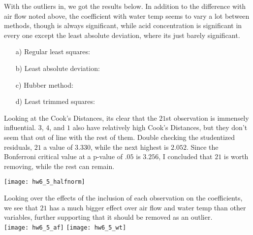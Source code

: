 \documentclass[11pt]{article}
\theoremstyle{definition}
\begin{document}
\begin{itemize}
        \smallskip
        With the outliers in, we got the results below. In addition to the difference with air flow noted above, the coefficient with water temp seems to vary a lot between methods, though is always significant, while  acid concentration is significant in every one except the least absolute deviation, where its just barely significant.
        \begin{itemize}
            \item[a)] Regular least squares: \\
                \FloatBarrier
                
                \FloatBarrier
            \item[b)] Least absolute deviation: \\
                \FloatBarrier
                
                \FloatBarrier
            \item[c)] Hubber method:\\
                \FloatBarrier
                
                \FloatBarrier
            \item[d)] Least trimmed squares: \\
                \FloatBarrier
                
                \FloatBarrier
        \end{itemize}
        Looking at the Cook's Distances, its clear that the $21$st observation is immensely influential. $3$, $4$, and $1$ also have relatively high Cook's Distances, but they don't seem that out of line with the rest of them. Double checking the studentized residuals, $21$ a value of $3.330$, while the next highest is $2.052$. Since the Bonferroni critical value at a p-value of $.05$ is $3.256$, I concluded that $21$ is worth removing, while the rest can remain.
        \begin{center}
            \texttt{[image: hw6\_5\_halfnorm]} 
        \end{center}
        Looking over the effects of the inclusion of each observation on the coefficients, we see that $21$ has a much bigger effect over air flow and water temp than other variables, further supporting that it should be removed as an outlier. \\ 
            \texttt{[image: hw6\_5\_af]} 
            \texttt{[image: hw6\_5\_wt]} \\


\end{itemize}
\end{document}
